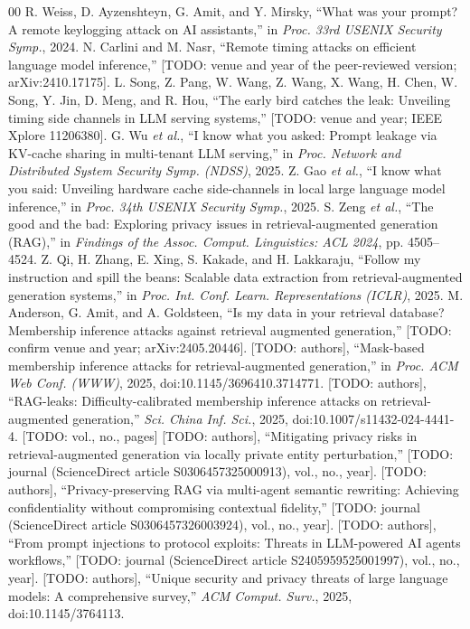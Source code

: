 \documentclass[conference]{IEEEtran}
\begin{document}
\begin{thebibliography}{00}
 R. Weiss, D. Ayzenshteyn, G. Amit, and Y. Mirsky, ``What was your prompt? A remote keylogging attack on AI assistants,'' in \emph{Proc. 33rd USENIX Security Symp.}, 2024.
 N. Carlini and M. Nasr, ``Remote timing attacks on efficient language model inference,'' [TODO: venue and year of the peer-reviewed version; arXiv:2410.17175].
 L. Song, Z. Pang, W. Wang, Z. Wang, X. Wang, H. Chen, W. Song, Y. Jin, D. Meng, and R. Hou, ``The early bird catches the leak: Unveiling timing side channels in LLM serving systems,'' [TODO: venue and year; IEEE Xplore 11206380].
 G. Wu \emph{et al.}, ``I know what you asked: Prompt leakage via KV-cache sharing in multi-tenant LLM serving,'' in \emph{Proc. Network and Distributed System Security Symp. (NDSS)}, 2025.
 Z. Gao \emph{et al.}, ``I know what you said: Unveiling hardware cache side-channels in local large language model inference,'' in \emph{Proc. 34th USENIX Security Symp.}, 2025.
 S. Zeng \emph{et al.}, ``The good and the bad: Exploring privacy issues in retrieval-augmented generation (RAG),'' in \emph{Findings of the Assoc. Comput. Linguistics: ACL 2024}, pp. 4505--4524.
 Z. Qi, H. Zhang, E. Xing, S. Kakade, and H. Lakkaraju, ``Follow my instruction and spill the beans: Scalable data extraction from retrieval-augmented generation systems,'' in \emph{Proc. Int. Conf. Learn. Representations (ICLR)}, 2025.
 M. Anderson, G. Amit, and A. Goldsteen, ``Is my data in your retrieval database? Membership inference attacks against retrieval augmented generation,'' [TODO: confirm venue and year; arXiv:2405.20446].
 [TODO: authors], ``Mask-based membership inference attacks for retrieval-augmented generation,'' in \emph{Proc. ACM Web Conf. (WWW)}, 2025, doi:10.1145/3696410.3714771.
 [TODO: authors], ``RAG-leaks: Difficulty-calibrated membership inference attacks on retrieval-augmented generation,'' \emph{Sci. China Inf. Sci.}, 2025, doi:10.1007/s11432-024-4441-4. [TODO: vol., no., pages]
 [TODO: authors], ``Mitigating privacy risks in retrieval-augmented generation via locally private entity perturbation,'' [TODO: journal (ScienceDirect article S0306457325000913), vol., no., year].
 [TODO: authors], ``Privacy-preserving RAG via multi-agent semantic rewriting: Achieving confidentiality without compromising contextual fidelity,'' [TODO: journal (ScienceDirect article S0306457326003924), vol., no., year].
 [TODO: authors], ``From prompt injections to protocol exploits: Threats in LLM-powered AI agents workflows,'' [TODO: journal (ScienceDirect article S2405959525001997), vol., no., year].
 [TODO: authors], ``Unique security and privacy threats of large language models: A comprehensive survey,'' \emph{ACM Comput. Surv.}, 2025, doi:10.1145/3764113.
\end{thebibliography}
\end{document}
